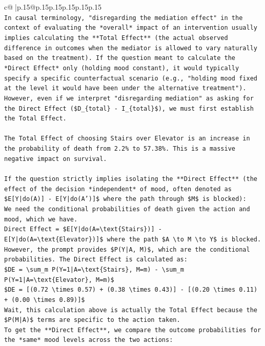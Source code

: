 \documentclass{article}
\begin{document}
{\begin{supertabular}{c@{$\;$}|p{.15\linewidth}@{}p{.15\linewidth}p{.15\linewidth}p{.15\linewidth}p{.15\linewidth}p{.15\linewidth}}
{{{\\ 
\texttt{In causal terminology, "disregarding the mediation effect" in the context of evaluating the *overall* impact of an intervention usually implies calculating the **Total Effect** (the actual observed difference in outcomes when the mediator is allowed to vary naturally based on the treatment). If the question meant to calculate the *Direct Effect* only (holding mood constant), it would typically specify a specific counterfactual scenario (e.g., "holding mood fixed at the level it would have been under the alternative treatment"). However, even if we interpret "disregarding mediation" as asking for the Direct Effect (\$D\_\{total\} {-} I\_\{total\}\$), we must first establish the Total Effect.} \\
\\ 
\texttt{The Total Effect of choosing Stairs over Elevator is an increase in the probability of death from 2.2\% to 57.38\%. This is a massive negative impact on survival.} \\
\\ 
\texttt{If the question strictly implies isolating the **Direct Effect** (the effect of the decision *independent* of mood, often denoted as \$E{[}Y|do(A){]} {-} E{[}Y|do(A'){]}\$ where the path through \$M\$ is blocked):} \\
\texttt{We need the conditional probabilities of death given the action and mood, which we have.} \\
\texttt{Direct Effect = \$E{[}Y|do(A=\textbackslash{}text\{Stairs\}){]} {-} E{[}Y|do(A=\textbackslash{}text\{Elevator\}){]}\$ where the path \$A \textbackslash{}to M \textbackslash{}to Y\$ is blocked.} \\
\texttt{However, the prompt provides \$P(Y|A, M)\$, which are the conditional probabilities. The Direct Effect is calculated as:} \\
\texttt{\$DE = \textbackslash{}sum\_m P(Y=1|A=\textbackslash{}text\{Stairs\}, M=m) {-} \textbackslash{}sum\_m P(Y=1|A=\textbackslash{}text\{Elevator\}, M=m)\$} \\
\texttt{\$DE = {[}(0.72 \textbackslash{}times 0.57) + (0.38 \textbackslash{}times 0.43){]} {-} {[}(0.20 \textbackslash{}times 0.11) + (0.00 \textbackslash{}times 0.89){]}\$} \\
\texttt{Wait, this calculation above is actually the Total Effect because the \$P(M|A)\$ terms are specific to the action taken.} \\
\texttt{To get the **Direct Effect**, we compare the outcome probabilities for the *same* mood levels across the two actions:} \\
}}}
\end{supertabular}}
\end{document}
